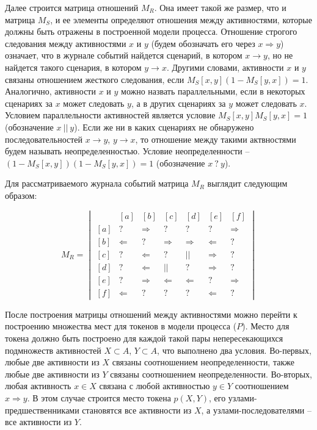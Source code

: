 \documentclass[
11pt,%
tightenlines,%
twoside,%
onecolumn,%
nofloats,%
nobibnotes,%
nofootinbib,%
superscriptaddress,%
noshowpacs,%
centertags]%
{revtex4}
\begin{document}
Далее строится матрица отношений $M_R$.
Она имеет такой же размер, что и матрица $M_S$, и ее элементы определяют отношения между активностями, которые должны быть отражены в построенной модели процесса.
Отношение строгого следования между активностями $x$ и $y$ (будем обозначать его через $x \Rightarrow y$) означает, что в журнале событий найдется сценарий, в котором $x \rightarrow y$, но не найдется такого сценария, в котором $y \rightarrow x$.
Другими словами, активности $x$ и $y$ связаны отношением жесткого следования, если $M_S[x, y](1 - M_S[y, x]) = 1$.
Аналогично, активности $x$ и $y$ можно назвать параллельными, если в некоторых сценариях за $x$ может следовать $y$, а в других сценариях за $y$ может следовать $x$.
Условием параллельности активностей является условие $M_S[x, y]M_S[y, x] = 1$ (обозначение $x \ || \ y$).
Если же ни в каких сценариях не обнаружено последовательностей $x \rightarrow y$, $y \rightarrow x$, то отношение между такими актвностями будем называть неопределенностью.
Условие неопределенности -- $(1 - M_S[x, y])(1 - M_S[y, x]) = 1$ (обозначение $x \ ? \ y$).

Для рассматриваемого журнала событий матрица $M_R$ выглядит следующим образом:

\begin{equation}\label{eqn:r}
M_R = \begin{vmatrix}
\ & [a] & [b] & [c] & [d] & [e] & [f] \\
[a] & ? & \Rightarrow & ? & ? & ? & \Rightarrow \\ 
[b] & \Leftarrow & ? & \Rightarrow & \Rightarrow & \Leftarrow & ? \\
[c] & ? & \Leftarrow & ? & || & \Rightarrow & ? \\
[d] & ? & \Leftarrow & || & ? & \Rightarrow & ? \\
[e] & ? & \Rightarrow & \Leftarrow & \Leftarrow & ? & \Rightarrow \\
[f] & \Leftarrow & ? & ? & ? & \Leftarrow & ?
\end{vmatrix}
\end{equation}

После построения матрицы отношений между активностями можно перейти к построению множества мест для токенов в модели процесса ($P$).
Место для токена должно быть построено для каждой такой пары непересекающихся подмножеств активностей $X \subset A$, $Y \subset A$, что выполнено два условия.
Во-первых, любые две активности из $X$ связаны соотношением неопределенности, также любые две активности из $Y$ связаны соотношением неопределенности.
Во-вторых, любая активность $x \in X$ связана с любой активностью $y \in Y$ соотношением $x \Rightarrow y$. 
В этом случае строится место токена $p(X, Y)$, его узлами-предшественниками становятся все активности из $X$, а узлами-последователями -- все активности из $Y$.
\end{document}
